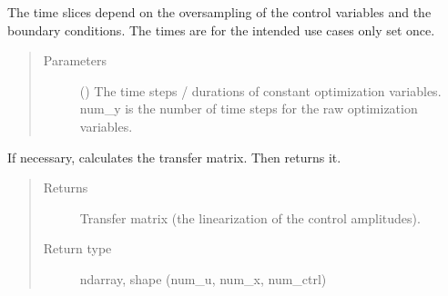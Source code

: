 \documentclass[letterpaper,10pt,english]{sphinxmanual}
\begin{document}
\begin{fulllineitems}
\begin{fulllineitems}
The time slices depend on the oversampling of the control variables
and the boundary conditions. The times are for the intended use cases
only set once.
\begin{quote}\begin{description}
\item[{Parameters}] \leavevmode
{} (\sphinxstyleliteralemphasis{\sphinxupquote{{[}}}\sphinxstyleliteralemphasis{\sphinxupquote{, }}\sphinxstyleliteralemphasis{\sphinxupquote{{]}}}\sphinxstyleliteralemphasis{\sphinxupquote{, }}\sphinxstyleliteralemphasis{\sphinxupquote{ (}}\sphinxstyleliteralemphasis{\sphinxupquote{)}}) \textendash{} The time steps / durations of constant optimization variables.
num\_y is the number of time steps for the raw optimization
variables.

\end{description}\end{quote}

\end{fulllineitems}


\begin{fulllineitems}
\label{\detokenize{qsim:qsim.transfer_function.TransferFunction.transfer_matrix}}
If necessary, calculates the transfer matrix. Then returns it.
\begin{quote}\begin{description}
\item[{Returns}] \leavevmode
{} \textendash{} Transfer matrix (the linearization of the control amplitudes).

\item[{Return type}] \leavevmode
ndarray, shape (num\_u, num\_x, num\_ctrl)

\end{description}\end{quote}

\end{fulllineitems}


\end{fulllineitems}
\end{document}
